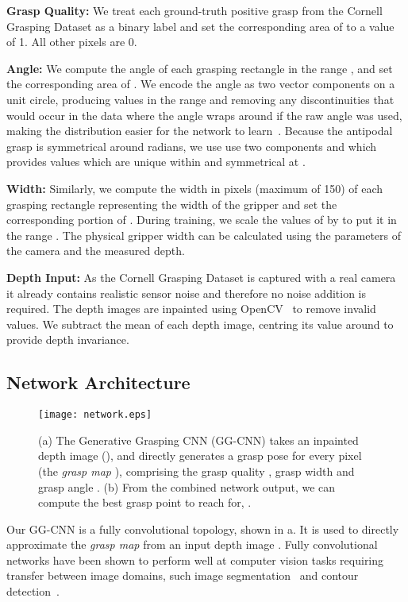 \documentclass[conference]{IEEEtran}
\begin{document}
\textbf{Grasp Quality:}  We treat each ground-truth positive grasp from the Cornell Grasping Dataset as a binary label and set the corresponding area of  to a value of 1. All other pixels are 0.

\textbf{Angle:} We compute the angle of each grasping rectangle in the range , and set the corresponding area of .  We encode the angle as two vector components on a unit circle, producing values in the range  and removing any discontinuities that would occur in the data where the angle wraps around  if the raw angle was used, making the distribution easier for the network to learn~\cite{hara2017designing}.  
Because the antipodal grasp is symmetrical around  radians, we use use two components  and  which provides values which are unique within  and symmetrical at .

\textbf{Width:} Similarly, we compute the width in pixels (maximum of 150) of each grasping rectangle representing the width of the gripper and set the corresponding portion of .  During training, we scale the values of  by  to put it in the range .  The physical gripper width can be calculated using the parameters of the camera and the measured depth.

\textbf{Depth Input:} As the Cornell Grasping Dataset is captured with a real camera it already contains realistic sensor noise and therefore no noise addition is required. The depth images are inpainted using OpenCV~\cite{opencv_library} to remove invalid values.  We subtract the mean of each depth image, centring its value around  to provide depth invariance.

\subsection{Network Architecture}

\begin{figure*}[t]
    \centering
    \texttt{[image: network.eps]}
    \vspace{-8mm}
    \caption{(a) The Generative Grasping CNN (GG-CNN) takes an inpainted depth image (), and directly generates a grasp pose for every pixel (the \textit{grasp map} ), comprising the grasp quality , grasp width  and grasp angle .  (b) From the combined network output, we can compute the best grasp point to reach for, .
    }
  \label{fig:architecture} 
  \vspace{-4mm}
\end{figure*}

Our GG-CNN is a fully convolutional topology, shown in a. It is used to directly approximate the \textit{grasp map}  from an input depth image .  Fully convolutional networks have been shown to perform well at computer vision tasks requiring transfer between image domains, such image segmentation~\cite{badrinarayanan2015segnet, long2015fully} and contour detection~\cite{yang2016object}.
\end{document}
